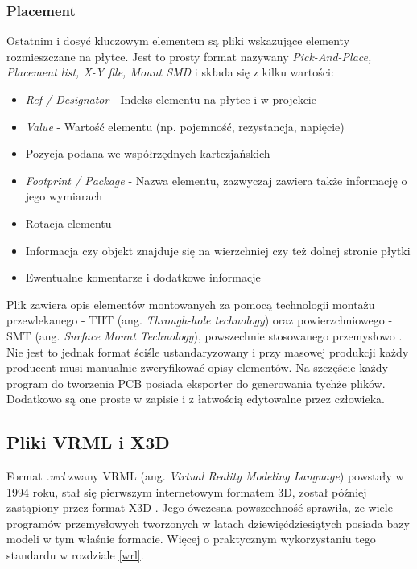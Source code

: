 \documentclass{xmgr}
\begin{document}
\subsubsection {Placement}
Ostatnim i dosyć kluczowym elementem są pliki wskazujące elementy rozmieszczane na płytce. Jest to prosty format nazywany \emph {Pick-And-Place, Placement list, X-Y file, Mount SMD}  i składa się z kilku wartości:
\begin{itemize}
\item \emph{Ref / Designator} - Indeks elementu na płytce i w projekcie
\item \emph{Value} - Wartość elementu (np. pojemność, rezystancja, napięcie)
\item Pozycja podana we współrzędnych kartezjańskich
\item \emph{Footprint / Package} - Nazwa elementu, zazwyczaj zawiera także informację o jego wymiarach
\item Rotacja elementu
\item Informacja czy objekt znajduje się na wierzchniej czy też dolnej stronie płytki
\item Ewentualne komentarze i dodatkowe informacje
\end{itemize}
Plik zawiera opis elementów montowanych za pomocą technologii montażu przewlekanego - THT (ang. \emph{Through-hole technology}) oraz powierzchniowego - SMT (ang. \emph{Surface Mount Technology}), powszechnie stosowanego przemysłowo \cite {prasad}. Nie jest to jednak format ściśle ustandaryzowany i przy masowej produkcji każdy producent musi manualnie zweryfikować opisy elementów. Na szczęście każdy program do tworzenia PCB posiada eksporter do generowania tychże plików. Dodatkowo są one proste w zapisie i z łatwością edytowalne przez człowieka.

\subsection{Pliki VRML i X3D}
Format \emph{.wrl} zwany VRML (ang. \emph {Virtual Reality Modeling Language}) powstały w 1994 roku, stał się pierwszym internetowym formatem 3D, został później zastąpiony przez format X3D \cite{vrml}. Jego ówczesna powszechność sprawiła, że wiele programów przemysłowych tworzonych w latach dziewięćdziesiątych posiada bazy modeli w tym właśnie formacie. Więcej o praktycznym wykorzystaniu tego standardu w rozdziale \ref{wrl}.
\end{document}
